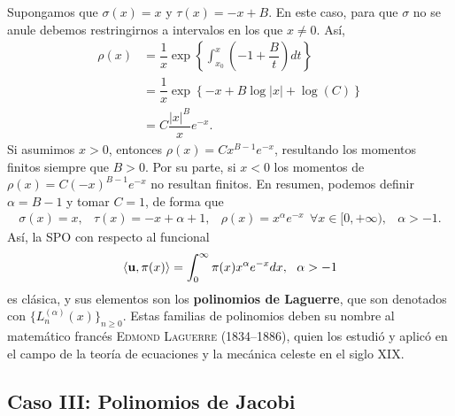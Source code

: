 Supongamos que $\sigma(x) = x$ y $\tau(x)=-x+B$. En este caso, para que $\sigma$ no se anule debemos restringirnos a intervalos en los que $x\neq0$. Así,
\begin{equation*}
    \begin{split}
        \rho(x) &= \dfrac 1 x \exp\left\{ \int_{x_0}^x \left(-1+\dfrac B t\right)dt \right\}\\
        &=  \dfrac 1 x \exp\left\{ -x + B\log|x| + \log(C) \right\} \\
        &= C \dfrac{|x|^B}{x}e^{-x}.
    \end{split}
\end{equation*}
Si asumimos $x>0$, entonces $\rho(x)=Cx^{B-1}e^{-x}$, resultando los momentos finitos siempre que $B > 0$. Por su parte, si $x<0$ los momentos de $\rho(x)=C(-x)^{B-1}e^{-x}$ no resultan finitos. En resumen, podemos definir $\alpha=B-1$ y tomar $C=1$, de forma que
\begin{equation}
    \label{eq:parametros-laguerre}
    \begin{array}{cccc}
        \sigma(x)=x, & \tau(x)=-x+\alpha+1, & \rho(x) = x^{\alpha} e^{-x}\ \ \forall x \in[0,+\infty), & \alpha > -1.
    \end{array}
\end{equation}
Así, la SPO con respecto al funcional
\begin{equation}
    \label{eq:func-laguerre}
    \prodesc{\uu}{\pi(x)} = \int_{0}^\infty \pi(x)x^{\alpha} e^{-x}dx, \ \ \alpha > -1
\end{equation}
es clásica, y sus elementos son los \textbf{polinomios de Laguerre}, que son denotados con $\{L_n^{(\alpha)}(x)\}_{n\geq 0}$. Estas familias de polinomios deben su nombre al matemático francés \textsc{Edmond Laguerre} (1834--1886), quien los estudió y aplicó en el campo de la teoría de ecuaciones y la mecánica celeste en el siglo XIX.

\subsection{Caso III: Polinomios de Jacobi}

